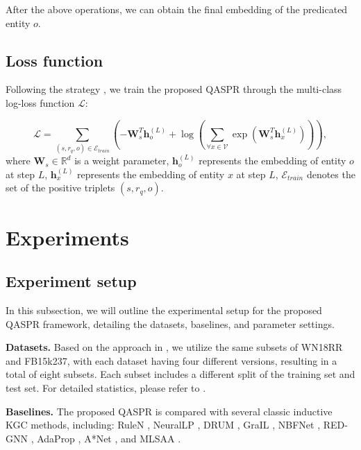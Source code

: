 \documentclass[sigconf]{acmart}
\begin{document}
After the above operations, we can obtain the final embedding of the predicated entity $o$.

\subsection{Loss function} \label{subsec:loss_function}
Following the strategy \cite{lacroix2018canonical}, we train the proposed QASPR through the multi-class log-loss function $\mathcal{L}$:

\begin{equation}
\label{multi-class}
    \mathcal{L} = \sum_{(s,r_q,o) \in \mathcal{E}_{train}}( -\mathbf{W}_{s}^{T}\mathbf{h}_{o}^{(L)} + \log(\sum_{\forall {x \in \mathcal{V}}}\exp(\mathbf{W}_{s}^{T}\mathbf{h}_{x}^{(L)}))),\nonumber
\end{equation}
where $\mathbf{W}_{s} \in \mathbb{R}^{d}$ is a weight parameter, $\mathbf{h}_{o}^{(L)}$ represents the embedding of entity $o$ at step $L$, $\mathbf{h}_{x}^{(L)}$ represents the embedding of entity $x$ at step $L$, $\mathcal{E}_{train}$ denotes the set of the positive triplets $(s,r_q,o)$.

\section{Experiments}\label{Sec:Experiments}
\subsection{Experiment setup}
In this subsection, we will outline the experimental setup for the proposed QASPR framework, detailing the datasets, baselines, and parameter settings.

\textbf{Datasets.} Based on the approach in \cite{zhu2023net}, we utilize the same subsets of WN18RR and FB15k237, with each dataset having four different versions, resulting in a total of eight subsets. Each subset includes a different split of the training set and test set. For detailed statistics, please refer to \cite{zhu2023net}.

\textbf{Baselines.} The proposed QASPR is compared with several classic inductive KGC methods, including: RuleN \cite{meilicke2018fine}, NeuralLP \cite{yang2017differentiable}, DRUM \cite{sadeghian2019drum}, GraIL \cite{teru2020inductive}, NBFNet \cite{zhu2021neural}, RED-GNN \cite{zhang2021knowledge}, AdaProp \cite{zhang2023adaprop}, A*Net \cite{zhu2023net}, and MLSAA \cite{skMLSAA2024}.
\end{document}
